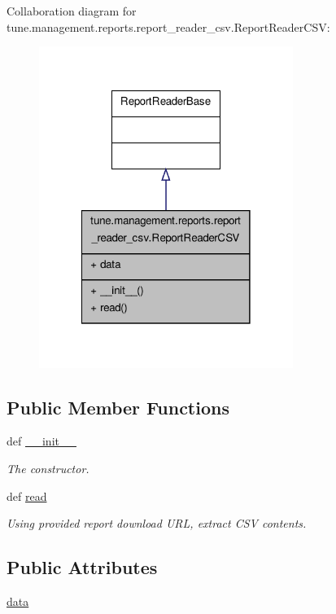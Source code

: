 Collaboration diagram for tune.\-management.\-reports.\-report\-\_\-reader\-\_\-csv.\-Report\-Reader\-C\-S\-V\-:
\nopagebreak
\begin{figure}[H]
\begin{center}
\leavevmode
\includegraphics[width=234pt]{classtune_1_1management_1_1reports_1_1report__reader__csv_1_1ReportReaderCSV__coll__graph}
\end{center}
\end{figure}
\subsection*{Public Member Functions}
\begin{DoxyCompactItemize}
\item 
def \hyperlink{classtune_1_1management_1_1reports_1_1report__reader__csv_1_1ReportReaderCSV_a418f8a33369c1269d59406d70c4d5562}{\-\_\-\-\_\-init\-\_\-\-\_\-}
\begin{DoxyCompactList}\small\item\em The constructor. \end{DoxyCompactList}\item 
def \hyperlink{classtune_1_1management_1_1reports_1_1report__reader__csv_1_1ReportReaderCSV_a761840bd958d0c771e9638a637bcfd55}{read}
\begin{DoxyCompactList}\small\item\em Using provided report download U\-R\-L, extract C\-S\-V contents. \end{DoxyCompactList}\end{DoxyCompactItemize}
\subsection*{Public Attributes}
\begin{DoxyCompactItemize}
\item 
\hyperlink{classtune_1_1management_1_1reports_1_1report__reader__csv_1_1ReportReaderCSV_a54edf30f0b976974d271d655393f90d8}{data}
\end{DoxyCompactItemize}


